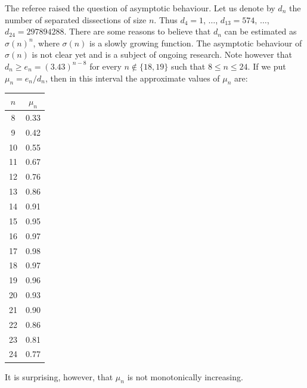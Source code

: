 \documentclass[12pt,amstags,fleqn]{article}
\theoremstyle{plain}
\theoremstyle{definition}
\begin{document}
The referee raised the question of asymptotic behaviour. Let us denote
by $d_n$ the number of separated dissections of size $n$.  Thus $d_4 = 1$,
$\dots$, $d_{13} = 574$, $\dots$, $d_{24} = 297894288$.  There are some
reasons to believe that $d_n$ can be estimated as $\sigma(n)^n$,
where $\sigma(n)$ is a slowly growing function. The asymptotic
behaviour of $\sigma(n)$ is not clear yet and is a subject of ongoing
research. Note however that $d_n \ge e_n = (3.43)^{n-8}$ for every
$n\notin \{18,19\}$ such that $8 \le n \le 24$.  If we put $\mu_n =
e_n/d_n$, then in this interval the approximate values of $\mu_n$
are:
\begin{center}
\begin{tabular}{|c|c|}
\hline $n$ & $\mu_n$ \\
\hline
\hline 8 & 0.33 \\
\hline 9 & 0.42 \\
\hline 10 & 0.55 \\
\hline 11 & 0.67 \\
\hline 12 & 0.76 \\
\hline 13 & 0.86 \\
\hline 14 & 0.91 \\
\hline 15 & 0.95 \\
\hline 16 & 0.97 \\
\hline 17 & 0.98 \\
\hline 18 & 0.97 \\
\hline 19 & 0.96 \\
\hline 20 & 0.93 \\
\hline 21 & 0.90 \\
\hline 22 & 0.86 \\
\hline 23 & 0.81 \\
\hline 24 & 0.77 \\
\hline
\end{tabular}
\end{center}
It is surprising, however, that $\mu_n$ is not monotonically increasing.
%
\end{document}
